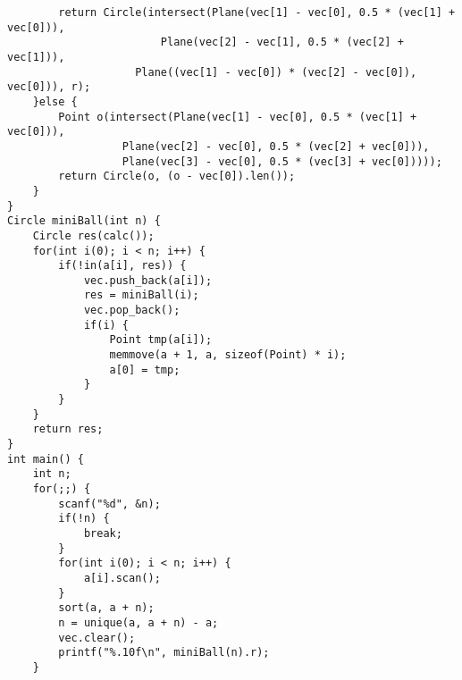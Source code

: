 \begin{lstlisting}
		return Circle(intersect(Plane(vec[1] - vec[0], 0.5 * (vec[1] + vec[0])),
				       	Plane(vec[2] - vec[1], 0.5 * (vec[2] + vec[1])),
					Plane((vec[1] - vec[0]) * (vec[2] - vec[0]), vec[0])), r);
	}else {
		Point o(intersect(Plane(vec[1] - vec[0], 0.5 * (vec[1] + vec[0])),
				  Plane(vec[2] - vec[0], 0.5 * (vec[2] + vec[0])),
				  Plane(vec[3] - vec[0], 0.5 * (vec[3] + vec[0]))));
		return Circle(o, (o - vec[0]).len());
	}
}
Circle miniBall(int n) {
	Circle res(calc());
	for(int i(0); i < n; i++) {
		if(!in(a[i], res)) {
			vec.push_back(a[i]);
			res = miniBall(i);
			vec.pop_back();
			if(i) {
				Point tmp(a[i]);
				memmove(a + 1, a, sizeof(Point) * i);
				a[0] = tmp;
			}
		}
	}
	return res;
}
int main() {
	int n;
	for(;;) {
		scanf("%d", &n);
		if(!n) {
			break;
		}
		for(int i(0); i < n; i++) {
			a[i].scan();
		}
		sort(a, a + n);
		n = unique(a, a + n) - a;
		vec.clear();
		printf("%.10f\n", miniBall(n).r);
	}

\end{lstlisting}
